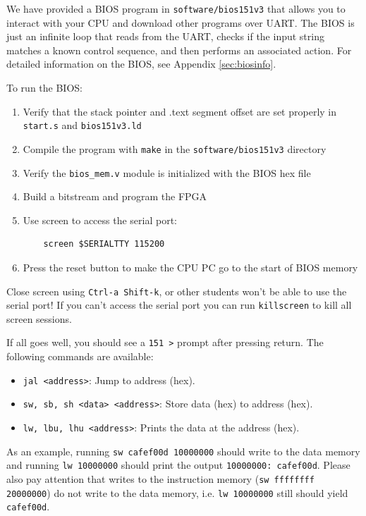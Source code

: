 \documentclass[11pt]{article}
\begin{document}
We have provided a BIOS program in \verb|software/bios151v3| that allows you to interact with your CPU and download other programs over UART.
The BIOS is just an infinite loop that reads from the UART, checks if the input string matches a known control sequence, and then performs an associated action.
For detailed information on the BIOS, see Appendix \ref{sec:biosinfo}.

To run the BIOS:
\begin{enumerate}
  \item Verify that the stack pointer and .text segment offset are set properly in \verb|start.s| and \verb|bios151v3.ld|
  \item Compile the program with \verb|make| in the \verb|software/bios151v3| directory
  \item Verify the \verb|bios_mem.v| module is initialized with the BIOS hex file
  \item Build a bitstream and program the FPGA
  \item Use screen to access the serial port:
    \begin{verbatim}
    screen $SERIALTTY 115200
    \end{verbatim}
  \item Press the reset button to make the CPU PC go to the start of BIOS memory
\end{enumerate}

Close screen using \verb|Ctrl-a Shift-k|, or other students won't be able to use the serial port!
If you can't access the serial port you can run \verb|killscreen| to kill all screen sessions.

If all goes well, you should see a \verb|151 >| prompt after pressing return. The following commands are available:
\begin{itemize}
    \item \verb|jal <address>|: Jump to address (hex).
    \item \verb|sw, sb, sh <data> <address>|: Store data (hex) to address (hex).
    \item \verb|lw, lbu, lhu <address>|: Prints the data at the address (hex).
\end{itemize}

As an example, running \verb|sw cafef00d 10000000| should write to the data memory and running \verb|lw 10000000| should print the output \verb|10000000: cafef00d|.
Please also pay attention that writes to the instruction memory (\verb|sw ffffffff 20000000|) do not write to the data memory, i.e. \verb|lw 10000000| still should yield \verb|cafef00d|.
\end{document}
